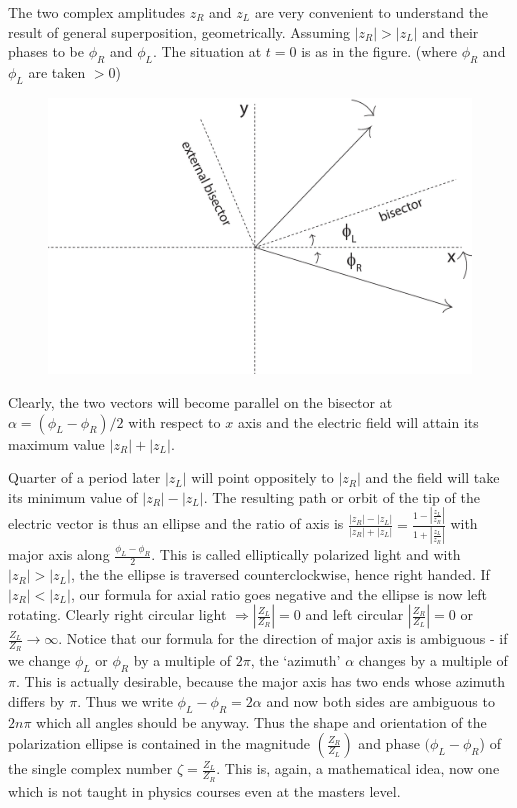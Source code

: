 The two complex amplitudes $z_R$ and $z_L$ are very convenient to understand
the result of general superposition, geometrically. Assuming $| z_R |>| z_L |$ and
their phases to be $\phi_R$ and $\phi_L$. The situation at $t = 0$ is as in the figure. (where $\phi_R$ and $\phi_L$ are taken $> 0$)
\begin{figure}[H]
\centering
\includegraphics[scale=0.15]{src/images/chap26/3.eps}
\end{figure}

Clearly, the two vectors will become parallel on the bisector at $\alpha = (\phi_L -\phi_R)/2$ 
with respect to $x$ axis and the electric field will attain its maximum value
$| z_R | + | z_L |$.

Quarter of a period later $| z_L |$ will point oppositely to $| z_R |$ and the field
will take its minimum value of $| z_R | - | z_L |$. The resulting path or orbit of the
tip of the electric vector is thus an ellipse and the ratio of axis is $\frac{|z_R| - |z_L|}{|z_R| + |z_L|} = \frac{1-|\frac{z_L}{z_R}|}{1+|\frac{z_L}{z_R}|}$
with major axis along $\frac{\phi_L -\phi_R}{2}$. This is called elliptically polarized light
and with $|z_R | > |z_L |$, the the ellipse is traversed counterclockwise, hence right
handed. If $|z_R | < |z_L |$, our formula for axial ratio goes negative and the ellipse
is now left rotating. Clearly right circular light $\Rightarrow |\frac{Z_L}{Z_R}| = 0$ and left circular $|\frac{Z_R}{Z_L}| =0$ or $\frac{Z_L}{Z_R} \to \infty$. 
 Notice that our formula for the direction of major axis is
ambiguous - if we change $\phi_L$ or $\phi_R$ by a multiple of $2\pi$, the `azimuth' $\alpha$ changes
by a multiple of $\pi$. This is actually desirable, because the major axis has two
ends whose azimuth differs by $\pi$. Thus we write $\phi_L - \phi_R = 2\alpha$ and now both
sides are ambiguous to $2n\pi$ which all angles should be anyway. Thus the shape
and orientation of the polarization ellipse is contained in the magnitude $\left(\frac{Z_R}{Z_L} \right)$
and phase $(\phi_L - \phi_R$) of the single complex number $\zeta = \frac{Z_L}{Z_R}$. This is, again, a
mathematical idea, now one which is not taught in physics courses even at the
masters level.


